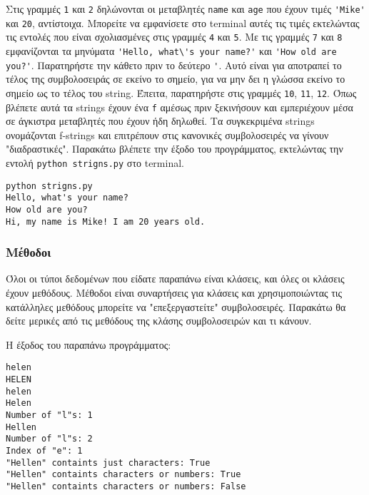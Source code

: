 \documentclass[12pt]{extreport}
\begin{document}


Στις γραμμές \lstinline{1} και \lstinline{2} δηλώνονται οι μεταβλητές \lstinline{name} και \lstinline{age} που έχουν τιμές \lstinline{'Mike'} και \lstinline{20}, αντίστοιχα. Μπορείτε να εμφανίσετε στο terminal αυτές τις τιμές εκτελώντας τις εντολές που είναι σχολιασμένες στις γραμμές \lstinline{4} και \lstinline{5}. Με τις γραμμές \lstinline{7} και \lstinline{8} εμφανίζονται τα μηνύματα \lstinline{'Hello, what\'s your name?'} και \lstinline{'How old are you?'}. Παρατηρήστε την κάθετο πριν το δεύτερο \lstinline{'}. Αυτό είναι για αποτραπεί το τέλος της συμβολοσειράς σε εκείνο το σημείο, για να μην δει η γλώσσα εκείνο το σημείο ως το τέλος του string. Έπειτα, παρατηρήστε στις γραμμές \lstinline{10}, \lstinline{11}, \lstinline{12}. Όπως βλέπετε αυτά τα strings έχουν ένα \lstinline{f} αμέσως πριν ξεκινήσουν και εμπεριέχουν μέσα σε άγκιστρα μεταβλητές που έχουν ήδη δηλωθεί. Τα συγκεκριμένα strings ονομάζονται f-strings και επιτρέπουν στις κανονικές συμβολοσειρές να γίνουν "διαδραστικές". Παρακάτω βλέπετε την έξοδο του προγράμματος, εκτελώντας την εντολή \lstinline{python strigns.py} στο terminal.

\begin{lstlisting}[language={}, numbers=none]
python strigns.py
Hello, what's your name?
How old are you?
Hi, my name is Mike! I am 20 years old.
\end{lstlisting}

\subsubsection{Μέθοδοι}

Όλοι οι τύποι δεδομένων που είδατε παραπάνω είναι κλάσεις, και όλες οι κλάσεις έχουν μεθόδους. Μέθοδοι είναι συναρτήσεις για κλάσεις και χρησιμοποιώντας τις κατάλληλες μεθόδους μπορείτε να "επεξεργαστείτε" συμβολοσειρές. Παρακάτω θα δείτε μερικές από τις μεθόδους της κλάσης συμβολοσειρών και τι κάνουν.




Η έξοδος του παραπάνω προγράμματος:

\begin{lstlisting}[language={}, numbers=none]
helen
HELEN
helen
Helen
Number of "l"s: 1
Hellen
Number of "l"s: 2
Index of "e": 1
"Hellen" containts just characters: True
"Hellen" containts characters or numbers: True
"Hellen" containts characters or numbers: False
\end{lstlisting}
\end{document}
